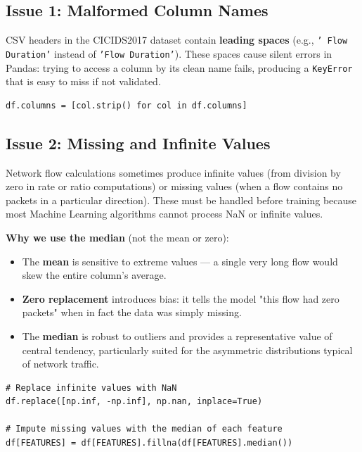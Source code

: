 \documentclass[12pt,a4paper]{report}
\begin{document}
\subsection{Issue 1: Malformed Column Names}

CSV headers in the CICIDS2017 dataset contain \textbf{leading spaces} (e.g., \texttt{' Flow Duration'} instead of \texttt{'Flow Duration'}). These spaces cause silent errors in Pandas: trying to access a column by its clean name fails, producing a \texttt{KeyError} that is easy to miss if not validated.

\begin{lstlisting}[caption={Stripping leading spaces from column names}]
df.columns = [col.strip() for col in df.columns]
\end{lstlisting}

\subsection{Issue 2: Missing and Infinite Values}

Network flow calculations sometimes produce infinite values (from division by zero in rate or ratio computations) or missing values (when a flow contains no packets in a particular direction). These must be handled before training because most Machine Learning algorithms cannot process NaN or infinite values.

\textbf{Why we use the median} (not the mean or zero):
\begin{itemize}
    \item The \textbf{mean} is sensitive to extreme values --- a single very long flow would skew the entire column's average.
    \item \textbf{Zero replacement} introduces bias: it tells the model "this flow had zero packets" when in fact the data was simply missing.
    \item The \textbf{median} is robust to outliers and provides a representative value of central tendency, particularly suited for the asymmetric distributions typical of network traffic.
\end{itemize}

\begin{lstlisting}[caption={Handling infinite and missing values}]
# Replace infinite values with NaN
df.replace([np.inf, -np.inf], np.nan, inplace=True)

# Impute missing values with the median of each feature
df[FEATURES] = df[FEATURES].fillna(df[FEATURES].median())
\end{lstlisting}
\end{document}
